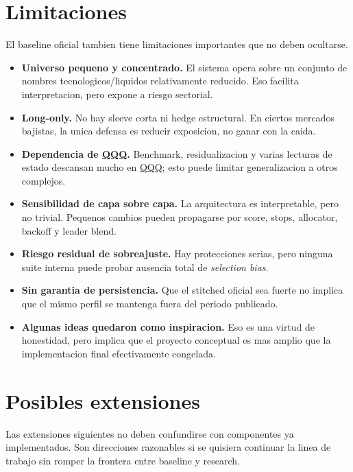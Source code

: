 \documentclass[11pt,letterpaper]{article}
\newcommand{\code}[1]{{\urlstyle{tt}\url{#1}}}
\begin{document}
\section{Limitaciones}
El baseline oficial tambien tiene limitaciones importantes que no deben ocultarse.

\begin{itemize}
    \item \textbf{Universo pequeno y concentrado.} El sistema opera sobre un conjunto de nombres tecnologicos/liquidos relativamente reducido. Eso facilita interpretacion, pero expone a riesgo sectorial.
    \item \textbf{Long-only.} No hay sleeve corta ni hedge estructural. En ciertos mercados bajistas, la unica defensa es reducir exposicion, no ganar con la caida.
    \item \textbf{Dependencia de \code{QQQ}.} Benchmark, residualizacion y varias lecturas de estado descansan mucho en \code{QQQ}; esto puede limitar generalizacion a otros complejos.
    \item \textbf{Sensibilidad de capa sobre capa.} La arquitectura es interpretable, pero no trivial. Pequenos cambios pueden propagarse por score, stops, allocator, backoff y leader blend.
    \item \textbf{Riesgo residual de sobreajuste.} Hay protecciones serias, pero ninguna suite interna puede probar ausencia total de \emph{selection bias}.
    \item \textbf{Sin garantia de persistencia.} Que el stitched oficial sea fuerte no implica que el mismo perfil se mantenga fuera del periodo publicado.
    \item \textbf{Algunas ideas quedaron como inspiracion.} Eso es una virtud de honestidad, pero implica que el proyecto conceptual es mas amplio que la implementacion final efectivamente congelada.
\end{itemize}

\section{Posibles extensiones}
Las extensiones siguientes no deben confundirse con componentes ya implementados. Son direcciones razonables si se quisiera continuar la linea de trabajo sin romper la frontera entre baseline y research.
\end{document}
